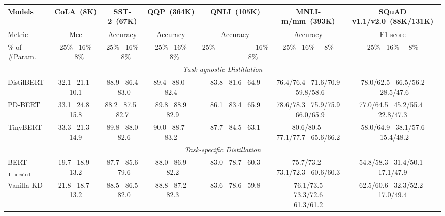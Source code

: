 \documentclass[letterpaper]{article} %
\begin{document}
	
	\appendix
	
	\begin{table}[thb!]
		\centering
		\scriptsize
		\begin{tabular}{lcccccc}
			\toprule
			Models&CoLA~(8K) & SST-2~(67K)                                                  & QQP~(364K)                                                    & QNLI~(105K)                                                   & MNLI-m/mm~(393K)                                                   & SQuAD v1.1/v2.0~(88K/131K)                                           \\
			\midrule
						Metric & Mcc                                                  & Accuracy                                                    & Accuracy                                                   & Accuracy                                                   & Accuracy             &F1 score                               \\
						\midrule
			 \% of \#Param. &25\% ~16\%  ~~8\%            &25\% ~16\%  ~~8\%             &25\% ~16\%  ~~8\%            &25\% ~~~~~~~~~	~16\%  ~~~~~~~~~~8\%            &25\% ~16\%  ~~8\%    &25\% ~16\%  ~~8\%        \\
			\midrule
		 \multicolumn{7}{c}{\textit{Task-agnostic Distillation}}   \\
			\midrule
			DistilBERT   &32.1~ 21.1~ 10.1   & 88.9 ~86.4 ~83.0          & 89.4~ 88.0~ 82.4          & 83.8~ 81.6~ 64.9          &  76.4/76.4 ~71.6/70.9 ~59.8/58.6           & 78.0/62.5~ 66.5/56.2 ~28.5/47.6      \\
			PD-BERT    &33.1~ 24.8~ 15.8     & 88.2~ 87.5~ 82.7          & 89.8 ~88.9 ~82.9          & 86.1~ 83.4~ 65.9          & 78.6/78.3 ~75.9/75.9 ~66.0/65.9          & 77.0/64.5 ~45.2/55.4~ 22.8/47.3        \\
			TinyBERT  &33.3~ 21.3~ 14.9      & 89.8 ~88.0 ~82.6          & 90.0~ 88.7~ 83.2          & 87.7 ~84.5~ 63.1          & 80.6/80.5~ 77.1/77.7~ 65.6/66.2         & 58.0/64.9 ~38.1/57.6 ~15.4/48.2        \\
			\midrule
			 \multicolumn{7}{c}{\textit{Task-specific Distillation}}   \\
				\midrule
			BERT$_{\text{Truncated}}$ &19.7~ 18.9~ 13.2 & 87.7 ~85.6 ~79.6          & 88.0~ 86.9 ~82.2          & 83.0 ~78.7 ~60.3          & 75.7/73.2~ 73.1/72.3~ 60.6/60.3          & 54.8/58.3~ 31.4/50.1~ 17.1/47.9         \\
			Vanilla KD     &21.8~ 18.7~ 13.2    & 88.5~ 86.5 ~82.0           & 88.8~ 87.2 ~82.3          & 83.6 ~78.6~ 59.8          & 76.1/73.5 ~73.3/72.6~ 61.3/61.2          & 62.5/60.6 ~32.3/52.2~ 17.0/49.4      \\

\end{tabular}
\end{table}
\end{document}
